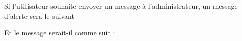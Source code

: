 \documentclass{article}
\begin{document}
\begin{enumerate}
               
Si l'utilisateur souhaite envoyer un message à l'administrateur, un message d'alerte sera le suivant
  
  
  \vspace{0.7cm}
               \hspace*{-0.7in}
               \noindent{} 
  
  
  Et le message serait-il comme suit :
 
   
   
   \vspace{0.7cm}
               \hspace*{-0.7in}
               \noindent{}                
               
               
               
               
               

\end{enumerate}
\end{document}
